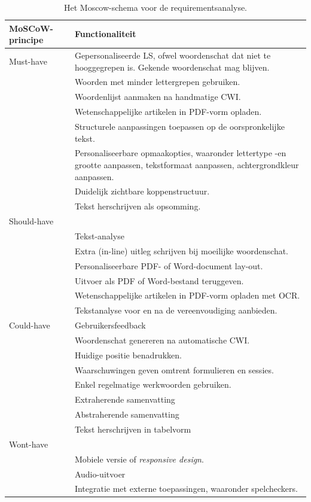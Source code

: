 \begin{center}
	\begin{table}[H]
		\begin{tabular}{ | m{4cm} | m{11cm} | } 
			\hline
			\textbf{MoSCoW-principe} & \textbf{Functionaliteit} \\
			\hline
			Must-have & Gepersonaliseerde LS, ofwel woordenschat dat niet te hooggegrepen is. Gekende woordenschat mag blijven. \\
			& Woorden met minder lettergrepen gebruiken. \\
			& Woordenlijst aanmaken na handmatige CWI. \\
			& Wetenschappelijke artikelen in PDF-vorm opladen. \\
			& Structurele aanpassingen toepassen op de oorspronkelijke tekst. \\
			& Personaliseerbare opmaakopties, waaronder lettertype -en grootte aanpassen, tekstformaat aanpassen, achtergrondkleur aanpassen. \\
			& Duidelijk zichtbare koppenstructuur. \\
			& Tekst herschrijven als opsomming. \\
			\hline
			Should-have & \\
			& Tekst-analyse \\
			& Extra (in-line) uitleg schrijven bij moeilijke woordenschat. \\
			& Personaliseerbare PDF- of Word-document lay-out. \\
			& Uitvoer als PDF of Word-bestand teruggeven. \\
			& Wetenschappelijke artikelen in PDF-vorm opladen met OCR. \\
			& Tekstanalyse voor en na de vereenvoudiging aanbieden. \\
			\hline
			Could-have 
			& Gebruikersfeedback \\
			& Woordenschat genereren na automatische CWI. \\
			& Huidige positie benadrukken. \\
			& Waarschuwingen geven omtrent formulieren en sessies. \\
			& Enkel regelmatige werkwoorden gebruiken. \\
			& Extraherende samenvatting \\
			& Abstraherende samenvatting \\
			& Tekst herschrijven in tabelvorm \\
			\hline
			Wont-have & \\
			& Mobiele versie of \textit{responsive design}. \\
			& Audio-uitvoer \\
			& Integratie met externe toepassingen, waaronder spelcheckers. \\
			\hline
		\end{tabular}
		\caption{Het Moscow-schema voor de requirementsanalyse.}
		\label{img:moscow-table}
	\end{table}
\end{center}

